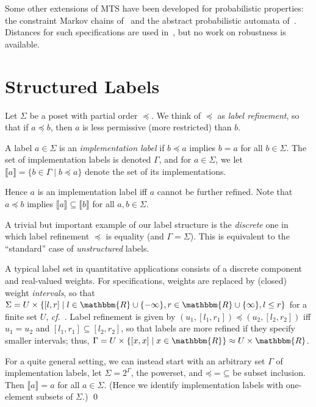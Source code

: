 \documentclass[twocolumn]{svjour3-dummy}
\newcommand*\labpre{\preccurlyeq}
\newcommand*\cf{\textit{cf.}\xspace}
\newcommand*\impl[1]{\llbracket #1\rrbracket}
\newcommand*\Real{\mathbbm{R}}
\begin{document}
Some other extensions of MTS have been developed for probabilistic
properties: the constraint Markov chains
of~\cite{DBLP:journals/jlp/DelahayeLLPW12,
  DBLP:journals/tcs/CaillaudDLLPW11,
  DBLP:conf/lics/JonssonL91} and the abstract probabilistic automata
of~\cite{DBLP:journals/tcs/CaillaudDLLPW11}.  Distances for such
specifications are used in~\cite{DBLP:journals/corr/abs-1212-4288}, but
no work on robustness is available.

\section{Structured Labels}
\label{se:structlabels}

Let $\Sigma$ be a poset with partial order $\labpre$.  We think of
$\labpre$ as \emph{label refinement}, so that if $a\labpre b$, then $a$
is less permissive (more restricted) than $b$.

\begin{definition}
  A label $a\in \Sigma$ is an \emph{implementation label} if $b\labpre
  a$ implies $b= a$ for all $b\in \Sigma$.  The set of implementation
  labels is denoted $\Gamma$, and for $a\in \Sigma$, we let $\impl
  a=\{ b\in \Gamma\mid b\labpre a\}$ denote the set of its
  implementations.
\end{definition}

Hence $a$ is an implementation label iff $a$ cannot be further
refined.  Note that $a\labpre b$ implies $\impl a\subseteq \impl b$
for all $a, b\in \Sigma$.

\begin{example}
  \label{ex:labelsets}
  A trivial but important example of our label structure is the
  \emph{discrete} one in which label refinement $\labpre$ is equality
  (and $\Gamma= \Sigma$).  This is equivalent to the ``standard'' case
  of \emph{unstructured} labels.

  A typical label set in quantitative applications consists of a
  discrete component and real-valued weights.  For specifications,
  weights are replaced by (closed) weight \emph{intervals}, so that
  $\Sigma= U\times\{[ l, r]\mid l\in \Real\cup\{ -\infty\}, r\in
  \Real\cup\{ \infty\}, l\le r\}$ for a finite set $U$,
  \cf~\cite{DBLP:journals/fmsd/BauerFJLLT13,
    DBLP:journals/mscs/BauerJLLS12}.  Label refinement is given by $(
  u_1,[ l_1, r_1])\labpre( u_2,[ l_2, r_2])$ iff $u_1= u_2$ and $[ l_1,
  r_1]\subseteq[ l_2, r_2]$, so that labels are more refined if they
  specify smaller intervals; thus, $\Gamma= U\times\{[ x, x]\mid x\in
  \Real\}\approx U\times \Real$.

  For a quite general setting, we can instead start with an arbitrary
  set $\Gamma$ of implementation labels, let $\Sigma= 2^\Gamma$, the
  powerset, and $\mathord\labpre= \mathord\subseteq$ be subset
  inclusion.  Then $\impl a= a$ for all $a\in \Sigma$.  (Hence we
  identify implementation labels with one-element subsets of $\Sigma$.)
  \qed
\end{example}
\end{document}
